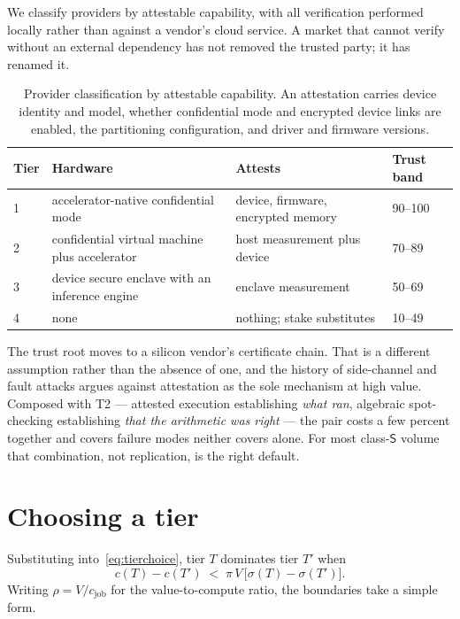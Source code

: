 \documentclass[11pt,a4paper]{article}
\begin{document}
We classify providers by attestable capability, with all verification performed
locally rather than against a vendor's cloud service. A market that cannot verify
without an external dependency has not removed the trusted party; it has renamed
it.

\begin{table}[h]
\centering
\begin{tabular}{llll}
\toprule
Tier & Hardware & Attests & Trust band \\
\midrule
1 & accelerator-native confidential mode & device, firmware, encrypted memory & 90--100 \\
2 & confidential virtual machine plus accelerator & host measurement plus device & 70--89 \\
3 & device secure enclave with an inference engine & enclave measurement & 50--69 \\
4 & none & nothing; stake substitutes & 10--49 \\
\bottomrule
\end{tabular}
\caption{Provider classification by attestable capability. An attestation carries
device identity and model, whether confidential mode and encrypted device links
are enabled, the partitioning configuration, and driver and firmware versions.}
\end{table}

The trust root moves to a silicon vendor's certificate chain. That is a different
assumption rather than the absence of one, and the history of side-channel and
fault attacks argues against attestation as the sole mechanism at high value.
Composed with T2 --- attested execution establishing \emph{what ran}, algebraic
spot-checking establishing \emph{that the arithmetic was right} --- the pair costs
a few percent together and covers failure modes neither covers alone. For most
class-$\mathsf{S}$ volume that combination, not replication, is the right default.

\section{Choosing a tier}

Substituting into~\eqref{eq:tierchoice}, tier $T$ dominates tier $T'$ when
\begin{equation}
c(T) - c(T') \;<\; \pi \, V \, \big[\sigma(T) - \sigma(T')\big].
\end{equation}
Writing $\rho = V / c_{\text{job}}$ for the value-to-compute ratio, the
boundaries take a simple form.
\end{document}
